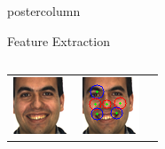 \documentclass[final,hyperref={pdfpagelabels=false}]{beamer}
\begin{document}
\begin{frame}
\begin{columns}
\begin{column}{.33\textwidth}
\begin{beamercolorbox}[center,wd=\textwidth]{postercolumn}
\begin{minipage}[T]{.95\textwidth}
{\begin{block}{Feature Extraction}
\begin{columns}
\begin{column}{.44\textwidth}
\begin{tabularx}{\linewidth}{ZZZ}
                    \includegraphics[width=0.95\linewidth]{images/viola/m-012-2.png}
                    &
                    \includegraphics[width=0.95\linewidth]{images/viola/surf-64x64-ip/m-012-2.pngsurf.png}
                    &

\end{tabularx}
\end{column}
\end{columns}
\end{block}}
\end{minipage}
\end{beamercolorbox}
\end{column}
\end{columns}
\end{frame}
\end{document}
